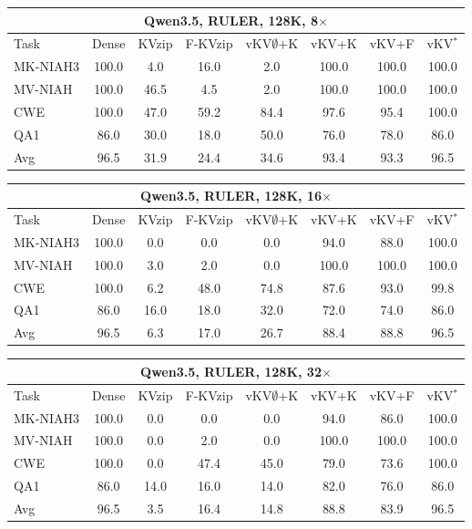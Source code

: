 \begin{tabular}{lccccccc}
\toprule
\multicolumn{8}{c}{Qwen3.5, RULER, 128K, 8$\times$} \\
\midrule
Task & Dense & KVzip & F-KVzip & vKV$\emptyset$+K & vKV+K & vKV+F & vKV$^\ast$ \\
\midrule
MK-NIAH3 & 100.0 & 4.0 & 16.0 & 2.0 & 100.0 & 100.0 & 100.0 \\
MV-NIAH & 100.0 & 46.5 & 4.5 & 2.0 & 100.0 & 100.0 & 100.0 \\
CWE & 100.0 & 47.0 & 59.2 & 84.4 & 97.6 & 95.4 & 100.0 \\
QA1 & 86.0 & 30.0 & 18.0 & 50.0 & 76.0 & 78.0 & 86.0 \\
\midrule
Avg & 96.5 & 31.9 & 24.4 & 34.6 & 93.4 & 93.3 & 96.5 \\
\bottomrule
\end{tabular}
\vspace{0.8em}

\begin{tabular}{lccccccc}
\toprule
\multicolumn{8}{c}{Qwen3.5, RULER, 128K, 16$\times$} \\
\midrule
Task & Dense & KVzip & F-KVzip & vKV$\emptyset$+K & vKV+K & vKV+F & vKV$^\ast$ \\
\midrule
MK-NIAH3 & 100.0 & 0.0 & 0.0 & 0.0 & 94.0 & 88.0 & 100.0 \\
MV-NIAH & 100.0 & 3.0 & 2.0 & 0.0 & 100.0 & 100.0 & 100.0 \\
CWE & 100.0 & 6.2 & 48.0 & 74.8 & 87.6 & 93.0 & 99.8 \\
QA1 & 86.0 & 16.0 & 18.0 & 32.0 & 72.0 & 74.0 & 86.0 \\
\midrule
Avg & 96.5 & 6.3 & 17.0 & 26.7 & 88.4 & 88.8 & 96.5 \\
\bottomrule
\end{tabular}
\vspace{0.8em}

\begin{tabular}{lccccccc}
\toprule
\multicolumn{8}{c}{Qwen3.5, RULER, 128K, 32$\times$} \\
\midrule
Task & Dense & KVzip & F-KVzip & vKV$\emptyset$+K & vKV+K & vKV+F & vKV$^\ast$ \\
\midrule
MK-NIAH3 & 100.0 & 0.0 & 0.0 & 0.0 & 94.0 & 86.0 & 100.0 \\
MV-NIAH & 100.0 & 0.0 & 2.0 & 0.0 & 100.0 & 100.0 & 100.0 \\
CWE & 100.0 & 0.0 & 47.4 & 45.0 & 79.0 & 73.6 & 100.0 \\
QA1 & 86.0 & 14.0 & 16.0 & 14.0 & 82.0 & 76.0 & 86.0 \\
\midrule
Avg & 96.5 & 3.5 & 16.4 & 14.8 & 88.8 & 83.9 & 96.5 \\
\bottomrule
\end{tabular}
\vspace{0.8em}

